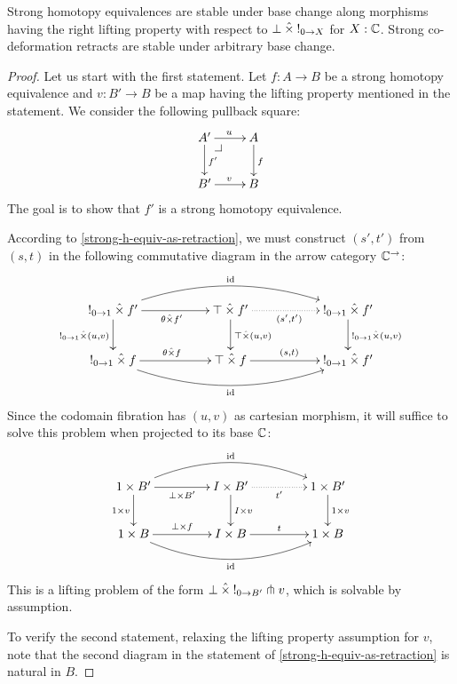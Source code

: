 \documentclass[reqno,10pt,a4paper,oneside]{amsart}
\begin{document}
\begin{lemma}
\label{strong-h-equiv-base-change-along-fibration}
Strong homotopy equivalences are stable under base change along morphisms having the right lifting property with respect to $\bot \mathbin{\hat{\times}} \mathord{!}_{0 \to X}$ for $X : \mathbb{C}$.
Strong co-deformation retracts are stable under arbitrary base change.
\end{lemma}

\begin{proof}
Let us start with the first statement.
Let $f : A \to B$ be a strong homotopy equivalence and $v : B' \to B$ be a map having the lifting property mentioned in the statement.
We consider the following pullback square:
\[
\xymatrix{
  A'
  \ar[r]^{u}
  \ar[d]^{f'}
  \pullback{dr}
&
  A
  \ar[d]^{f}
\\
  B'
  \ar[r]^{v}
&
  B
}
\]
The goal is to show that $f'$ is a strong homotopy equivalence.

According to \cref{strong-h-equiv-as-retraction}, we must construct $(s', t')$ from $(s, t)$ in the following commutative diagram in the arrow category $\mathbb{C}^{\to}$:
\[
\xymatrix@C+3em{
  \canonical_{0 \to 1} \hattimes f'
  \ar[r]_{\theta \hattimes f'}
  \ar[d]_{\canonical_{0 \to 1} \hattimes (u, v)}
  \ar@/^2em/[rr]^{\id}
&
  \top \hattimes f'
  \ar@{.>}[r]_{(s', t')}
  \ar[d]^{\top \hattimes (u, v)}
&
  \canonical_{0 \to 1} \hattimes f'
  \ar[d]^{\canonical_{0 \to 1} \hattimes (u, v)}
\\
  \canonical_{0 \to 1} \hattimes f
  \ar[r]^{\theta \hattimes f}
  \ar@/_2em/[rr]_{\id}
&
  \top \hattimes f
  \ar[r]^{(s, t)}
&
  \canonical_{0 \to 1} \hattimes f'
}
\]
Since the codomain fibration has $(u, v)$ as cartesian morphism, it will suffice to solve this problem when projected to its base $\mathbb{C}$:
\[
\xymatrix@C+2em{
  1 \times B'
  \ar[r]_{\bot \times B'}
  \ar[d]_{1 \times v}
  \ar@/^2em/[rr]^{\id}
&
  I \times B'
  \ar@{.>}[r]_{t'}
  \ar[d]^{I \times v}
&
  1 \times B'
  \ar[d]^{1 \times v}
\\
  1 \times B
  \ar[r]^{\bot \times f}
  \ar@/_2em/[rr]_{\id}
&
  I \times B
  \ar[r]^{t}
&
  1 \times B
}
\]
This is a lifting problem of the form $\bot \mathbin{\hat{\times}} \mathord{!}_{0 \to B'} \pitchfork v$, which is solvable by assumption.

To verify the second statement, relaxing the lifting property assumption for $v$, note that the second diagram in the statement of \cref{strong-h-equiv-as-retraction} is natural in $B$.
\end{proof}
\end{document}

